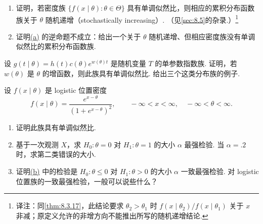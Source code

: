 \begin{exercise}\label{exercise:8.26}\leavevmode
\begin{enumerate}
\item{}\label{itm:exercise:8.26:a} 证明，若密度族 $\{f(x\mid\theta):\theta\in\Theta\}$ 具有单调似然比，则相应的累积分布函数族关于 $\theta$ 随机递增（stochastically increasing\mbox{）.} （见\autoref{sec:8.5}的杂录.）\footnote{译注：同\autoref{thm:8.3.17}，此结论要求 $\theta_2>\theta_1$ 时 $f(x\mid\theta_2)/f(x\mid\theta_1)$ 关于 $x$ 非减；原定义允许的非增方向不能推出所写的随机递增结论.}
\item 证明\hyperref[itm:exercise:8.26:a]{(a)} 的逆命题不成立：给出一个关于 $\theta$ 随机递增、但相应密度族没有单调似然比的累积分布函数族.
\end{enumerate}
\end{exercise}
\begin{exercise}\label{exercise:8.27}
设 $g(t\mid\theta)=h(t)c(\theta)e^{w(\theta)t}$ 是随机变量 $T$ 的单参数指数族. 证明，若 $w(\theta)$ 是 $\theta$ 的增函数，则此族具有单调似然比. 给出三个这类分布族的例子.
\end{exercise}
\begin{exercise}\label{exercise:8.28}
设 $f(x\mid\theta)$ 是 logistic 位置密度
$$f(x\mid\theta)=\frac{e^{x-\theta}}{(1+e^{x-\theta})^2},\qquad-\infty<x<\infty,\quad-\infty<\theta<\infty.$$
\begin{enumerate}
\item 证明此族具有单调似然比.
\item{}\label{itm:exercise:8.28:b} 基于一次观测 $X$，求 $H_0:\theta=0$ 对 $H_1:\theta=1$ 的大小 $\alpha$ 最强检验. 当 $\alpha=.2$ 时，求第二类错误的大小.
\item 证明\hyperref[itm:exercise:8.28:b]{(b)} 中的检验是 $H_0:\theta\le0$ 对 $H_1:\theta>0$ 的大小 $\alpha$ 一致最强检验. 对 logistic 位置族的一致最强检验，一般可以说些什么？
\end{enumerate}
\end{exercise}

